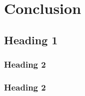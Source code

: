 \chapter[Conclusion]{Conclusion}
\label{Chap:Conclusion}

\section{Heading 1}

\subsection{Heading 2}
\lipsum[4] %

\subsection{Heading 2}
\lipsum[4]

